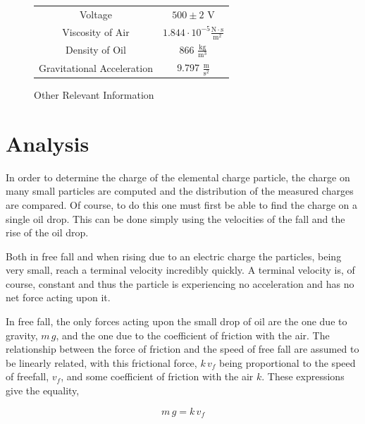 \documentclass[]{article}
\begin{document}
\begin{figure}
	
	\centering
	\caption{Other Relevant Information}
	\begin{tabular}{ | c | c | }
		\hline
		Voltage & \( 500 \pm 2\) V\\
		Viscosity of Air & \(1.844 \cdot 10^{-5} \mathrm{\frac{N \cdot s}{m^2}}\) \\
		Density of Oil & 866 \( \mathrm{\frac{kg}{m^3}}\)\\
		Gravitational Acceleration \footnotemark & 9.797 \( \mathrm{\frac{m}{s^2}}\) \\
		\hline
	\end{tabular}

\end{figure}




\section{Analysis}
In order to determine the charge of the elemental charge particle, the charge on many small particles are computed and the distribution of the measured charges are compared. Of course, to do this one must first be able to find the charge on a single oil drop. This can be done simply using the velocities of the fall and the rise of the oil drop.

Both in free fall and when rising due to an electric charge the particles, being very small, reach a terminal velocity incredibly quickly. A terminal velocity is, of course, constant and thus the particle is experiencing no acceleration and has no net force acting upon it.

In free fall, the only forces acting upon the small drop of oil are the one due to gravity, \( m \, g \), and the one due to the coefficient of friction with the air. The relationship between the force of friction and the speed of free fall are assumed to be linearly related, with this frictional force, \(k \, v_f\) being proportional to the speed of freefall, \(v_f \), and some coefficient of friction with the air \( k \). These expressions give the equality,

\begin{equation}
m \, g = k \, v_f
\end{equation}
\end{document}
